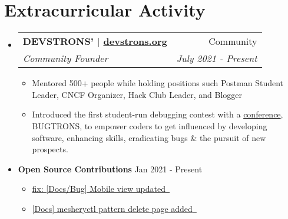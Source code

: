\documentclass[letterpaper,11pt]{article}
\makeatletter
\newcommand{\resumeItem}[2]{
  \item\small{
    \textbf{#1}{#2 \vspace{-2pt}}
  }
}
\newcommand{\resumeSubHeading}[4]{
  \vspace{-1pt}\item
    \begin{tabular*}{0.97\textwidth}{l@{\extracolsep{\fill}}r}
      \textbf{#1} & #2 \\
      \textit{\small#3} & \textit{\small #4} \\
    \end{tabular*}\vspace{-5pt}
}
\newcommand{\resumeSubHeadingListStart}{\begin{itemize}[leftmargin=*]}
\newcommand{\resumeSubHeadingListEnd}{\end{itemize}}
\newcommand{\resumeItemListStart}{\begin{itemize}}
\newcommand{\resumeItemListEnd}{\end{itemize}\vspace{-5pt}}
\makeatother
\begin{document}
\section{Extracurricular Activity}
\resumeSubHeadingListStart
\resumeSubHeading
{DEVSTRONS' $|$ \href{https://devstrons.org}{devstrons.org}}{Community}
{Community Founder}{July 2021 - Present}
\resumeItemListStart
\resumeItem{}{Mentored 500+ people while holding positions such Postman Student Leader, CNCF Organizer, Hack Club Leader, and Blogger}
\resumeItem{}{Introduced the first student-run debugging contest with a \href{https://bit.ly/bugtrons2-con}{conference}, BUGTRONS, to empower coders to get influenced by developing software, enhancing skills, eradicating bugs \& the pursuit of new prospects.}
\resumeItemListEnd
\vspace{2pt}
\item{
      \textbf{Open Source Contributions}{}
      \vspace{-7pt}
      \hfill
      \textbf{}{Jan 2021 - Present}
}
\resumeItemListStart
\item \href{https://github.com/jenkins-x/jx-docs/pull/3381}{{fix: [Docs/Bug] Mobile view updated} \,\faExternalLink}
\vspace{-3pt}
\item \href{https://github.com/meshery/meshery/pull/3070}{{[Docs] mesheryctl pattern delete page added} \,\faExternalLink}
\resumeItemListEnd
\resumeSubHeadingListEnd

\end{document}
